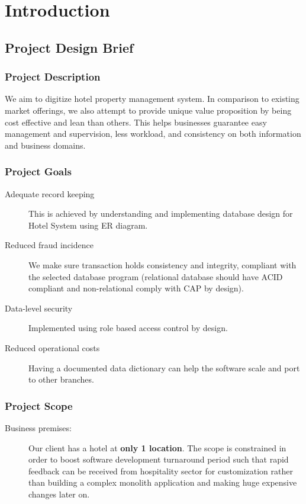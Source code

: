 \chapter{Introduction}

\section[Project Details]{Project Design Brief}

\subsection{Project Description}

We aim to digitize hotel property management system. In comparison to existing market offerings, we also attempt to provide unique value proposition by being cost effective and lean than others. This helps businesses guarantee easy management and supervision, less workload, and consistency on both information and business domains.

\subsection{Project Goals}

\begin{description}
	\item[Adequate record keeping] This is achieved by understanding and implementing database design for Hotel System using ER diagram.
	\item[Reduced fraud incidence] We make sure transaction holds consistency and integrity, compliant with the selected database program (relational database should have ACID compliant and non-relational comply with CAP by design).
	\item[Data-level security] Implemented using role based access control by design.
	\item[Reduced operational costs] Having a documented data dictionary can help the software scale and port to other branches.
\end{description}

\subsection{Project Scope}

\begin{description}
	\item[Business premises:] Our client has a hotel at \textbf{only 1 location}. The scope is constrained in order to boost software development turnaround period such that rapid feedback can be received from hospitality sector for customization rather than building a complex monolith application and making huge expensive changes later on.
\end{description}

